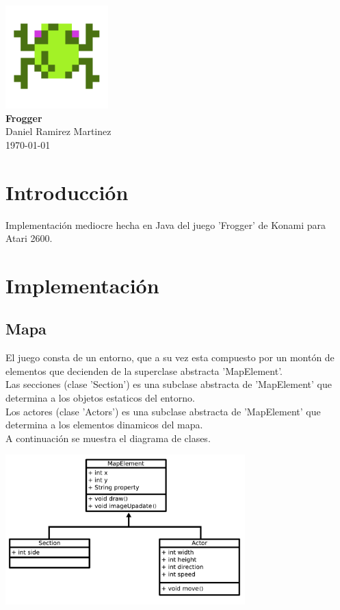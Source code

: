 \documentclass[letter, 12pt] {article}
\begin{document}
\begin {titlepage}
  \begin {center}
    \includegraphics[width=150px] {./img/Icon.png} \\[.7cm]
    { \Huge \bfseries Frogger } \\[.4cm]
    \Large Daniel Ramirez Martinez \\[.2cm]
    \large \today
  \end {center}
\end {titlepage}

\section* {Introducción}
Implementación mediocre hecha en Java del juego 'Frogger' de Konami 
para Atari 2600. \\[1cm]


\section* {Implementación}
\subsection* {Mapa}
El juego consta de un entorno, que a su vez esta compuesto por un
montón de elementos que decienden de la superclase abstracta
'MapElement'.\\

Las secciones (clase 'Section') es una subclase abstracta de 
'MapElement' que determina a los objetos estaticos del entorno.\\

Los actores (clase 'Actors') es una subclase abstracta de 'MapElement'
que determina a los elementos dinamicos del mapa.\\

A continuación se muestra el diagrama de clases.
\begin {center}
  \includegraphics[width=350px]{./img/MapElements-UML.pdf}\\[1cm]
\end {center}
\end{document}
